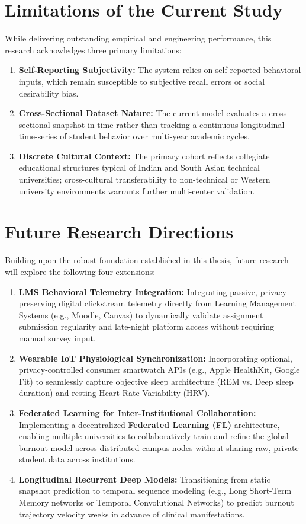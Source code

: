 \documentclass[12pt,a4paper,oneside]{report}
\begin{document}
\section{Limitations of the Current Study}
\label{sec:limitations}
While delivering outstanding empirical and engineering performance, this research acknowledges three primary limitations:
\begin{enumerate}
    \item \textbf{Self-Reporting Subjectivity:} The system relies on self-reported behavioral inputs, which remain susceptible to subjective recall errors or social desirability bias.
    \item \textbf{Cross-Sectional Dataset Nature:} The current model evaluates a cross-sectional snapshot in time rather than tracking a continuous longitudinal time-series of student behavior over multi-year academic cycles.
    \item \textbf{Discrete Cultural Context:} The primary cohort reflects collegiate educational structures typical of Indian and South Asian technical universities; cross-cultural transferability to non-technical or Western university environments warrants further multi-center validation.
\end{enumerate}

\section{Future Research Directions}
\label{sec:future_work}
Building upon the robust foundation established in this thesis, future research will explore the following four extensions:
\begin{enumerate}
    \item \textbf{LMS Behavioral Telemetry Integration:} Integrating passive, privacy-preserving digital clickstream telemetry directly from Learning Management Systems (e.g., Moodle, Canvas) to dynamically validate assignment submission regularity and late-night platform access without requiring manual survey input.
    \item \textbf{Wearable IoT Physiological Synchronization:} Incorporating optional, privacy-controlled consumer smartwatch APIs (e.g., Apple HealthKit, Google Fit) to seamlessly capture objective sleep architecture (REM vs. Deep sleep duration) and resting Heart Rate Variability (HRV).
    \item \textbf{Federated Learning for Inter-Institutional Collaboration:} Implementing a decentralized \textbf{Federated Learning (FL)} architecture, enabling multiple universities to collaboratively train and refine the global burnout model across distributed campus nodes without sharing raw, private student data across institutions.
    \item \textbf{Longitudinal Recurrent Deep Models:} Transitioning from static snapshot prediction to temporal sequence modeling (e.g., Long Short-Term Memory networks or Temporal Convolutional Networks) to predict burnout trajectory velocity weeks in advance of clinical manifestations.
\end{enumerate}
\end{document}
